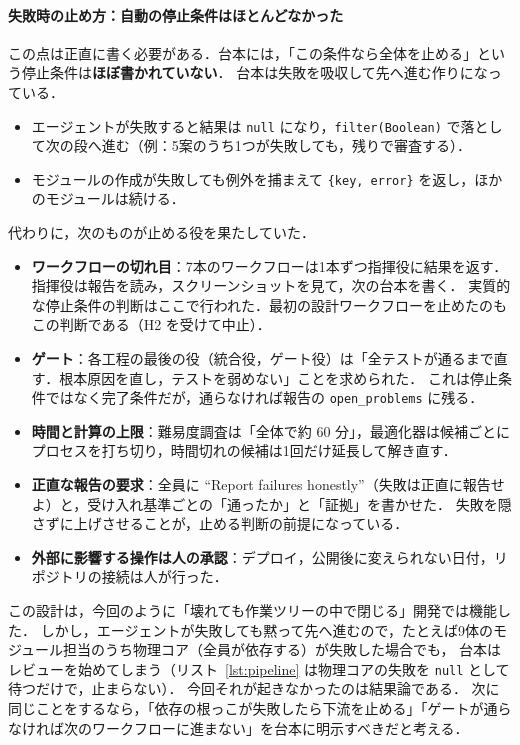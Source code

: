 \documentclass[a4paper,10pt]{ltjsarticle}
\newcommand{\lstref}[1]{リスト~\ref{#1}}
\newcommand{\code}[1]{\texttt{#1}}
\begin{document}
\paragraph{失敗時の止め方：自動の停止条件はほとんどなかった}
この点は正直に書く必要がある．台本には，「この条件なら全体を止める」という停止条件は\textbf{ほぼ書かれていない}．
台本は失敗を吸収して先へ進む作りになっている．
\begin{itemize}
  \item エージェントが失敗すると結果は \code{null} になり，\code{filter(Boolean)} で落として次の段へ進む（例：5案のうち1つが失敗しても，残りで審査する）．
  \item モジュールの作成が失敗しても例外を捕まえて \code{\{key, error\}} を返し，ほかのモジュールは続ける．
\end{itemize}
代わりに，次のものが止める役を果たしていた．
\begin{itemize}
  \item \textbf{ワークフローの切れ目}：7本のワークフローは1本ずつ指揮役に結果を返す．指揮役は報告を読み，スクリーンショットを見て，次の台本を書く．
  実質的な停止条件の判断はここで行われた．最初の設計ワークフローを止めたのもこの判断である（H2 を受けて中止）．
  \item \textbf{ゲート}：各工程の最後の役（統合役，ゲート役）は「全テストが通るまで直す．根本原因を直し，テストを弱めない」ことを求められた．
  これは停止条件ではなく完了条件だが，通らなければ報告の \code{open\_problems} に残る．
  \item \textbf{時間と計算の上限}：難易度調査は「全体で約 60 分」，最適化器は候補ごとにプロセスを打ち切り，時間切れの候補は1回だけ延長して解き直す．
  \item \textbf{正直な報告の要求}：全員に ``Report failures honestly''（失敗は正直に報告せよ）と，受け入れ基準ごとの「通ったか」と「証拠」を書かせた．
  失敗を隠さずに上げさせることが，止める判断の前提になっている．
  \item \textbf{外部に影響する操作は人の承認}：デプロイ，公開後に変えられない日付，リポジトリの接続は人が行った．
\end{itemize}
この設計は，今回のように「壊れても作業ツリーの中で閉じる」開発では機能した．
しかし，エージェントが失敗しても黙って先へ進むので，たとえば9体のモジュール担当のうち物理コア（全員が依存する）が失敗した場合でも，
台本はレビューを始めてしまう（\lstref{lst:pipeline} は物理コアの失敗を \code{null} として待つだけで，止まらない）．
今回それが起きなかったのは結果論である．
次に同じことをするなら，「依存の根っこが失敗したら下流を止める」「ゲートが通らなければ次のワークフローに進まない」を台本に明示すべきだと考える．
\end{document}
